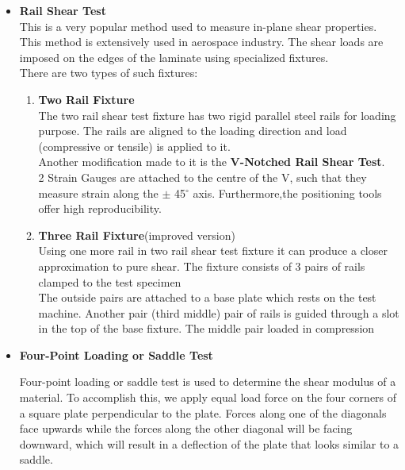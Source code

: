 \documentclass[12pt,a4paper]{article}	%
\begin{document}
\begin{itemize}
\item \textbf{Rail Shear Test} \\
This is a very popular method used to measure in-plane shear properties. This method is extensively used in aerospace industry. The shear loads are imposed on the edges of the laminate using specialized fixtures.\\
There are two types of such fixtures:

\begin{enumerate}	
	\item  \textbf{Two Rail Fixture}\\
	The two rail shear test fixture has two rigid parallel steel rails for loading purpose. The rails are aligned to the loading	direction and load (compressive or tensile) is applied to it.\\
	
	Another modification made to it is the \textbf{ V-Notched Rail Shear Test}.\\
	
	2 Strain Gauges are attached to the centre of the V, such that they measure strain along the $\pm$ 45$^{\circ}$ axis. Furthermore,the positioning tools offer high reproducibility.\\
	
	
	\item \textbf{Three Rail Fixture}(improved version)\\
	Using one more rail in two rail	shear test fixture it can produce a closer approximation to pure shear. The fixture consists of 3 pairs	of rails clamped to the test specimen\\
	
	The outside pairs are attached to a base plate which rests on the test machine. Another pair (third middle) pair of rails is guided through	a slot in the top of the base fixture. The middle pair loaded in compression\\
	
	
\end{enumerate}

\item \textbf{Four-Point Loading or Saddle Test}

Four-point loading or saddle test is used to determine the shear modulus of a material. To accomplish this, we apply equal load force on the four corners of a square plate perpendicular to the plate. Forces along one of the diagonals face upwards while the forces along the other diagonal will be facing downward, which will result in a deflection of the plate that looks similar to a saddle.\\


\end{itemize}
\end{document}

